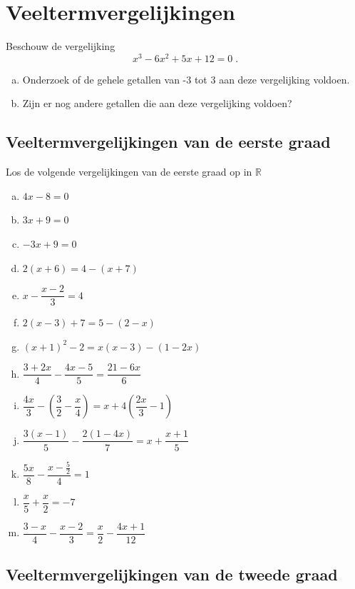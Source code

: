 \documentclass[12pt]{article}
\begin{document}
\onehalfspacing

\section{Veeltermvergelijkingen}

\begin{oefening}
Beschouw de vergelijking
$$x^3-6x^2+5x+12=0\;.$$
\begin{enumerate}[(a)]
  \item Onderzoek of de gehele getallen van -3 tot 3 aan deze vergelijking voldoen.
  \item Zijn er nog andere getallen die aan deze vergelijking voldoen?
\end{enumerate}

\subsection{Veeltermvergelijkingen van de eerste graad}

\end{oefening}
\begin{oefening}
Los de volgende vergelijkingen van de eerste graad op in $\mathbb{R}$
\begin{enumerate}[(a)]
  \itemsep0.7em
  \item $4x-8=0$
  \item $3x+9=0$
  \item $-3x+9=0$
  \item $2(x+6)=4-(x+7)$
  \item $x - \dfrac{x-2}{3} = 4$
  \item $2(x-3)+7=5-(2-x)$
  \item $(x+1)^2-2=x(x-3)-(1-2x)$
  \item $\dfrac{3+2x}{4}-\dfrac{4x-5}{5}=\dfrac{21-6x}{6}$
  \item $\dfrac{4x}{3}-\left(\dfrac{3}{2}-\dfrac{x}{4}\right)=x+4\left(\dfrac{2x}{3}-1\right)$
  \item $\dfrac{3(x-1)}{5}-\dfrac{2(1-4x)}{7}=x+\dfrac{x+1}{5}$
  \item $\dfrac{5x}{8}-\dfrac{x-\frac{5}{2}}{4}=1$
  \item $\dfrac{x}{5}+\dfrac{x}{2}=-7$
  \item $\dfrac{3-x}{4}-\dfrac{x-2}{3}=\dfrac{x}{2}-\dfrac{4x+1}{12}$
\end{enumerate}
\end{oefening}

\pagebreak
\subsection{Veeltermvergelijkingen van de tweede graad}
\end{document}
